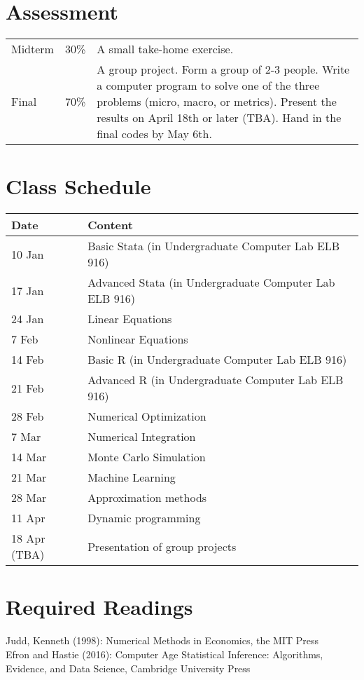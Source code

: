 \documentclass[11pt]{article}
\begin{document}
\section{Assessment}
\begin{tabular}{p{0.5in}p{0.5in}p{5in}}
   Midterm & 30\% & A small take-home exercise. \\
   Final  & 70\%  & A group project. Form a group of 2-3 people. Write a computer program to solve one of the three problems (micro, macro, or metrics). Present the results on April 18th or later (TBA). Hand in the final codes by May 6th.
\end{tabular}

\section{Class Schedule}
\begin{tabular}{p{1in}p{4in}}
  \hline
  Date & Content \\
  \hline
  10 Jan & Basic Stata (in Undergraduate Computer Lab ELB 916) \\
  17 Jan & Advanced Stata (in Undergraduate Computer Lab ELB 916) \\
  24 Jan & Linear Equations \\
  7 Feb & Nonlinear Equations \\
  14 Feb & Basic R (in Undergraduate Computer Lab ELB 916) \\
  21 Feb & Advanced R (in Undergraduate Computer Lab ELB 916) \\
  28 Feb & Numerical Optimization  \\
  7 Mar & Numerical Integration \\
  14 Mar & Monte Carlo Simulation \\
  21 Mar & Machine Learning \\
  28 Mar & Approximation methods \\
  11 Apr & Dynamic programming \\
  18 Apr (TBA) & Presentation of group projects \\
  \hline
\end{tabular}





\section{Required Readings}
Judd, Kenneth (1998): Numerical Methods in Economics, the MIT Press \\
Efron and Hastie (2016): Computer Age Statistical Inference: Algorithms, Evidence, and Data Science, Cambridge University Press
\end{document}
